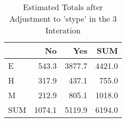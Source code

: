 \begin{table}[ht]
\centering
\caption{Estimated Totals after Adjustment to 'stype' in the 3 Interation} 
\begin{tabular}{l|rr|r}
  & No & Yes & SUM \\ 
  \hline
E & 543.3 & 3877.7 & 4421.0 \\ 
  H & 317.9 & 437.1 & 755.0 \\ 
  M & 212.9 & 805.1 & 1018.0 \\ 
   \hline
SUM & 1074.1 & 5119.9 & 6194.0 \\ 
  \end{tabular}
\end{table}
